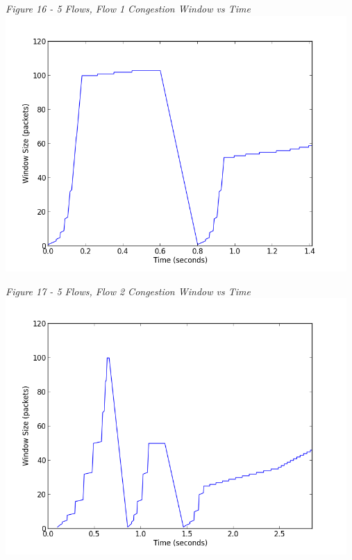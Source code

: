 \documentclass[11pt]{article}
\begin{document}
\textit{Figure 16 - 5 Flows, Flow 1 Congestion Window vs Time}
\\
\includegraphics[width=13cm]{5_data/5_1-window}
\vspace{0.25cm}

\textit{Figure 17 - 5 Flows, Flow 2 Congestion Window vs Time}
\\
\includegraphics[width=13cm]{5_data/5_2-window}
\vspace{0.25cm}
\end{document}
